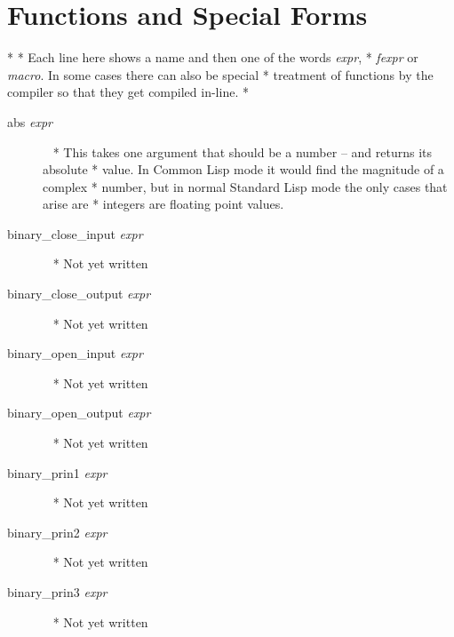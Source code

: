 \documentclass[a4paper,11pt]{article}
\begin{document}
\section{Functions and Special Forms}
  *
  * Each line here shows a name and then one of the words {\itshape  expr},
  * {\itshape  fexpr} or {\itshape  macro}. In some cases there can also be special
  * treatment of functions by the compiler so that they get compiled in-line.
  * \begin{description}

\item [{\ttfamily abs} {\itshape  expr}]  ~\newline
  * This takes one argument that should be a number -- and returns its absolute
  * value. In Common Lisp mode it would find the magnitude of a complex
  * number, but in normal Standard Lisp mode the only cases that arise are
  * integers are floating point values.

\item [{\ttfamily binary\_close\_input} {\itshape  expr}]  ~\newline
  * Not yet written

\item [{\ttfamily binary\_close\_output} {\itshape  expr}]  ~\newline
  * Not yet written

\item [{\ttfamily binary\_open\_input} {\itshape  expr}]  ~\newline
  * Not yet written

\item [{\ttfamily binary\_open\_output} {\itshape  expr}]  ~\newline
  * Not yet written

\item [{\ttfamily binary\_prin1} {\itshape  expr}]  ~\newline
  * Not yet written

\item [{\ttfamily binary\_prin2} {\itshape  expr}]  ~\newline
  * Not yet written

\item [{\ttfamily binary\_prin3} {\itshape  expr}]  ~\newline
  * Not yet written


\end{description}
\end{document}
